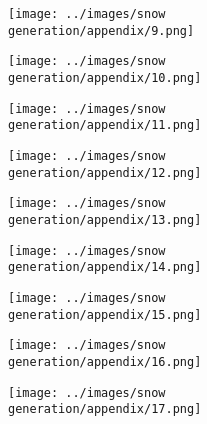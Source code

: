 \begin{figure}[H]
 \hspace{1em}%
 \begin{subfigure}[b]{0.1\textwidth}
   \centering
   \texttt{[image: ../images/snow generation/appendix/9.png]}
 \end{subfigure}
 \hspace{1em}%
 \begin{subfigure}[b]{0.1\textwidth}
   \centering
   \texttt{[image: ../images/snow generation/appendix/10.png]}
 \end{subfigure}
 \hspace{1em}%
 \begin{subfigure}[b]{0.1\textwidth}
   \centering
   \texttt{[image: ../images/snow generation/appendix/11.png]}
 \end{subfigure}
 \hspace{1em}%
 \begin{subfigure}[b]{0.1\textwidth}
 \centering
 \texttt{[image: ../images/snow generation/appendix/12.png]}
 \end{subfigure}
 \hspace{1em}%
 \begin{subfigure}[b]{0.1\textwidth}
   \centering
   \texttt{[image: ../images/snow generation/appendix/13.png]}
 \end{subfigure}
 \hspace{1em}%
 \begin{subfigure}[b]{0.1\textwidth}
   \centering
   \texttt{[image: ../images/snow generation/appendix/14.png]}
 \end{subfigure}
 \hspace{1em}%
 \begin{subfigure}[b]{0.1\textwidth}
   \centering
   \texttt{[image: ../images/snow generation/appendix/15.png]}
 \end{subfigure}
 \hspace{1em}%
 \begin{subfigure}[b]{0.1\textwidth}
 \centering
 \texttt{[image: ../images/snow generation/appendix/16.png]}
 \end{subfigure}
 \hspace{1em}%
 \begin{subfigure}[b]{0.1\textwidth}
 \centering
 \texttt{[image: ../images/snow generation/appendix/17.png]}
\end{subfigure}
\hspace{1em}%

\end{figure}
